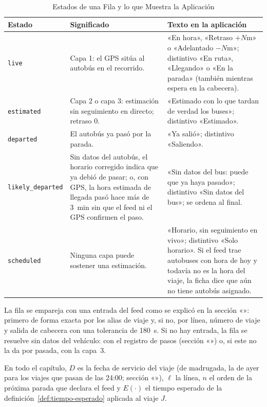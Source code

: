 \begin{table}[ht]
\centering
\caption{Estados de una Fila y lo que Muestra la Aplicación}\label{tab:estados}
\begin{tabularx}{\textwidth}{@{}l>{\raggedright\arraybackslash}X>{\raggedright\arraybackslash}X@{}}
\toprule
Estado & Significado & Texto en la aplicación\\
\midrule
\texttt{live} & Capa 1: el GPS sitúa al autobús en el recorrido. & «En hora», «Retraso $+N$m» o «Adelantado $-N$m»; distintivo «En ruta», «Llegando» o «En la parada» (también mientras espera en la cabecera). \\
\texttt{estimated} & Capa 2 o capa 3: estimación sin seguimiento en directo; retraso $0$. & «Estimado con lo que tardan de verdad los buses»; distintivo «Estimado». \\
\texttt{departed} & El autobús ya pasó por la parada. & «Ya salió»; distintivo «Saliendo». \\
\texttt{likely\_departed} & Sin datos del autobús, el horario corregido indica que ya debió de pasar; o, con GPS, la hora estimada de llegada pasó hace más de 3~min sin que el feed ni el GPS confirmen el paso. & «Sin datos del bus: puede que ya haya pasado»; distintivo «Sin datos del bus»; se ordena al final. \\
\texttt{scheduled} & Ninguna capa puede sostener una estimación. & «Horario, sin seguimiento en vivo»; distintivo «Solo horario». Si el feed trae autobuses con hora de hoy y todavía no es la hora del viaje, la ficha dice que aún no tiene autobús asignado. \\
\bottomrule
\end{tabularx}
\end{table}

La fila se empareja con una entrada del feed como se explicó en la sección «»: primero de forma
exacta por los alias de viaje y, si no, por línea, número de viaje y salida de cabecera con una tolerancia de 180~s.
Si no hay entrada, la fila se resuelve sin datos del vehículo: con el registro de pasos (sección
«») o, si este no la da por pasada, con la capa~3.

En todo el capítulo, $D$ es la fecha de servicio del viaje (de madrugada, la de ayer para los viajes que pasan de las 24:00; sección «»), $\ell$ la línea, $n$ el orden de la próxima parada que declara el
feed y $E(\cdot)$ el tiempo esperado de la definición~\ref{def:tiempo-esperado} aplicada al viaje $J$.

